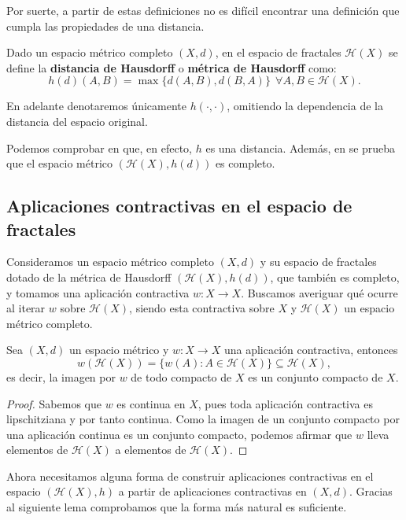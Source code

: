 Por suerte, a partir de estas definiciones no es difícil encontrar una definición que cumpla las propiedades de una distancia.

\begin{definicion}
    Dado un espacio métrico completo $(X,d)$, en el espacio de fractales $\mathcal{H}(X)$ se define la \textbf{distancia de Hausdorff} o \textbf{métrica de Hausdorff} como:
    $$
    h(d)(A,B)=\max\{d(A,B),d(B,A)\} \ \ \forall A,B\in\mathcal H(X).
    $$
\end{definicion}

En adelante denotaremos únicamente $h(\cdot,\cdot)$, omitiendo la dependencia de la distancia del espacio original.

Podemos comprobar en \cite[Sección 2.6]{Barnsley} que, en efecto, $h$ es una distancia. Además, en \cite[Sección 2.7]{Barnsley} se prueba que el espacio métrico $(\mathcal{H}(X), h(d))$ es completo.

\subsection{Aplicaciones contractivas en el espacio de fractales}

Consideramos un espacio métrico completo $(X,d)$ y su espacio de fractales dotado de la métrica de Hausdorff $(\mathcal H(X), h(d))$, que también es completo, y tomamos una aplicación contractiva $w:X\longrightarrow X$. Buscamos averiguar qué ocurre al iterar $w$ sobre $\mathcal{H}(X)$, siendo esta contractiva sobre $X$ y $\mathcal{H}(X)$ un espacio métrico completo. 

\begin{lema}
    \label{lema:contractivas-compactos}
    Sea $(X,d)$ un espacio métrico y $w:X\longrightarrow X$ una aplicación contractiva, entonces 
    $$w(\mathcal{H}(X))=\{w(A):A\in\mathcal{H}(X)\}\subseteq\mathcal{H}(X),$$
    es decir, la imagen por $w$ de todo compacto de $X$ es un conjunto compacto de $X$.
\end{lema}
\begin{proof}
    Sabemos que $w$ es continua en $X$, pues toda aplicación contractiva es lipschitziana y por tanto continua. Como la imagen de un conjunto compacto por una aplicación continua es un conjunto compacto, podemos afirmar que $w$ lleva elementos de $\mathcal{H}(X)$ a elementos de $\mathcal{H}(X)$.
\end{proof}

Ahora necesitamos alguna forma de construir aplicaciones contractivas en el espacio $(\mathcal{H}(X),h)$ a partir de aplicaciones contractivas en $(X,d)$. Gracias al siguiente lema comprobamos que la forma más natural es suficiente.

